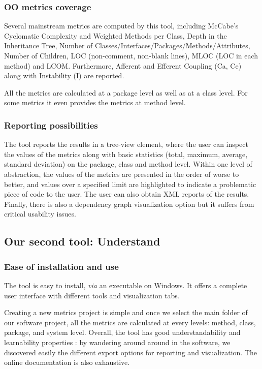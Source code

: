     \subsubsection{OO metrics coverage}
    
        Several mainstream metrics are computed by this tool, including McCabe's Cyclomatic Complexity and Weighted Methods per Class, Depth in the Inheritance Tree, Number of Classes/Interfaces/Packages/Methods/Attributes, Number of Children, LOC (non-comment, non-blank lines), MLOC (LOC in each method) and LCOM. Furthermore, Afferent and Efferent Coupling (Ca, Ce) along with Instability (I) are reported.
        
        All the metrics are calculated at a package level as well as at a class level. For some metrics it even provides the metrics at method level.
    
    \subsubsection{Reporting possibilities}
    
        The tool reports the results in a tree-view element, where the user can inspect the values of the metrics along with basic statistics (total, maximum, average, standard deviation) on the package, class and method level. Within one level of abstraction, the values of the metrics are presented in the order of worse to better, and values over a specified limit are highlighted to indicate a problematic piece of code to the user. The user can also obtain XML reports of the results. Finally, there is also a dependency graph visualization option but it suffers from critical usability issues.
    
\subsection{Our second tool: Understand}

    \subsubsection{Ease of installation and use}
    
        The tool is easy to install, \textit{via} an executable on Windows. It offers a complete user interface with different tools and visualization tabs.
        
        Creating a new metrics project is simple and once we select the main folder of our software project, all the metrics are calculated at every levels: method, class, package, and system level. Overall, the tool has good understandability and learnability properties : by wandering around around in the software, we discovered easily the different export options for reporting and visualization. The online documentation is also exhaustive.
        
